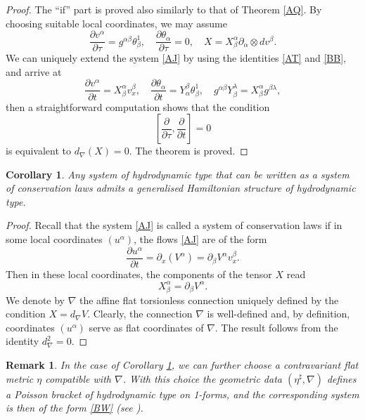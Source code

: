 \documentclass[11pt,a4paper]{amsart}
\numberwithin{equation}{section}
\newtheorem{rmk}[theorem]{Remark}
\newtheorem{corollary}[theorem]{Corollary}
\newcommand{\diff}[2]{\frac{\partial #1}{\partial #2}}
\newcommand{\qa}{\alpha}
\newcommand{\qb}{\beta}
\newcommand{\qt}{\tau}
\newcommand{\qth}{\theta}
\newcommand{\qp}{\partial}
\newcommand{\ql}{\lambda}
\newcommand{\fk}[2]{\left[#1, #2\right]}
\numberwithin{equation}{section}
\begin{document}
\begin{proof}
The ``if'' part is proved also similarly to that of Theorem \ref{AQ}. By choosing  suitable local coordinates, we may assume 
    \[
    \diff{v^\qa}{\qt} = g^{\qa\qb}\qth_\qb^1,\quad \diff{\qth_\qa}{\qt} = 0,\quad X = X^\qa_\qb \qp_\qa\otimes dv^\qb.
    \]
    We can uniquely extend the system \eqref{AJ} by using the identities \eqref{AT} and \eqref{BB}, and arrive at   
    \[
    \diff{v^\qa}{t} = X^\qa_\qb v_x^\qb,\quad \diff{\qth_\qa}{t} = Y^\qb_\qa\qth_\qb^1,\quad g^{\qa\qb}Y^\ql_\qb = X^\qa_\qb g^{\qb\ql},
    \]
    then a straightforward computation shows that the condition 
    \[
\fk{\diff{}{\qt}}{\diff{}{t}} = 0
\]
is equivalent to $d_\nabla(X) = 0$. The theorem is proved. 
\end{proof}


\begin{corollary}
  \label{BV}
Any system of hydrodynamic type that can be written as a system of conservation laws admits a generalised Hamiltonian structure of hydrodynamic type.
\end{corollary}
\begin{proof} 
  Recall that the system \eqref{AJ} is called a system of conservation laws if in some local coordinates $(u^\qa)$, the flows \eqref{AJ} are of the form 
  \[
  \diff{u^\qa}{t} = \qp_x(V^\qa) = \qp_\qb V^\qa v^\qb_x.
  \]
  Then in these local coordinates, the components of the tensor $X$ read 
  \[
    X^\qa_\qb = \qp_\qb V^\qa.
  \]
  We denote by $\nabla$ the affine flat torsionless connection uniquely defined by the condition $X=d_{\nabla}V$. Clearly, the connection $\nabla$ is well-defined and, by definition, coordinates $(u^\alpha)$ serve as 
  flat coordinates of $\nabla$. The result follows from the identity $d^2_{\nabla}=0$.
\end{proof}


\begin{rmk}
  In the case of Corollary \ref{BV}, we can further choose a contravariant flat metric $\eta$ compatible with $\nabla$. With this choice the geometric data $(\eta^\sharp,\nabla)$ defines a Poisson bracket of hydrodynamic type on 1-forms, and the corresponding system is then of the form \eqref{BW} (see \cite{AL12}).
\end{rmk}
\end{document}

